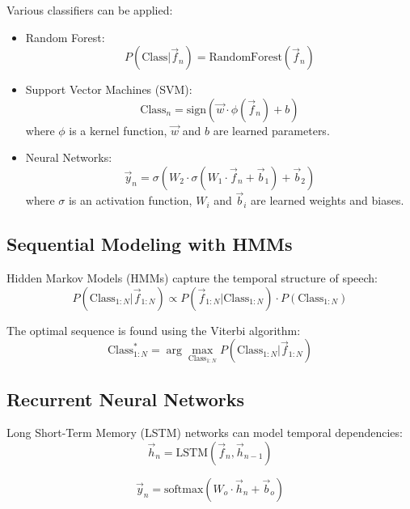 \documentclass[10pt,journal,compsoc]{IEEEtran}
\begin{document}
Various classifiers can be applied:
\begin{itemize}
    \item Random Forest: 
    \begin{equation}
    P(\text{Class} | \vec{f}_n) = \text{RandomForest}(\vec{f}_n)
    \end{equation}
    
    \item Support Vector Machines (SVM):
    \begin{equation}
    \text{Class}_n = \text{sign}(\vec{w} \cdot \phi(\vec{f}_n) + b)
    \end{equation}
    where $\phi$ is a kernel function, $\vec{w}$ and $b$ are learned parameters.
    
    \item Neural Networks:
    \begin{equation}
    \vec{y}_n = \sigma(W_2 \cdot \sigma(W_1 \cdot \vec{f}_n + \vec{b}_1) + \vec{b}_2)
    \end{equation}
    where $\sigma$ is an activation function, $W_i$ and $\vec{b}_i$ are learned weights and biases.
\end{itemize}

\subsection{Sequential Modeling with HMMs}
Hidden Markov Models (HMMs) capture the temporal structure of speech:
\begin{equation}
P(\text{Class}_{1:N} | \vec{f}_{1:N}) \propto P(\vec{f}_{1:N} | \text{Class}_{1:N}) \cdot P(\text{Class}_{1:N})
\end{equation}

The optimal sequence is found using the Viterbi algorithm:
\begin{equation}
\text{Class}^*_{1:N} = \arg\max_{\text{Class}_{1:N}} P(\text{Class}_{1:N} | \vec{f}_{1:N})
\end{equation}

\subsection{Recurrent Neural Networks}
Long Short-Term Memory (LSTM) networks can model temporal dependencies:
\begin{equation}
\vec{h}_n = \text{LSTM}(\vec{f}_n, \vec{h}_{n-1})
\end{equation}

\begin{equation}
\vec{y}_n = \text{softmax}(W_o \cdot \vec{h}_n + \vec{b}_o)
\end{equation}
\end{document}
